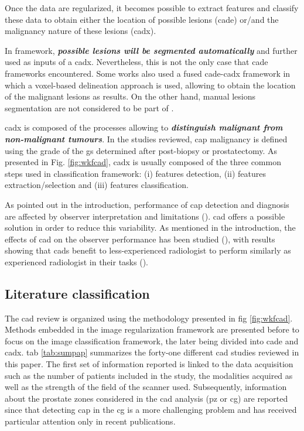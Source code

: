 Once the data are regularized, it becomes possible to extract features and classify these data to obtain either the location of possible lesions (\ac{cade}) or/and the malignancy nature of these lesions (\ac{cadx}).

In  framework, \textbf{\textit{possible lesions will be segmented automatically}} and further used as inputs of a \ac{cadx}. Nevertheless, this is not the only case that \ac{cade} frameworks encountered. Some works also used a fused \ac{cade}-\ac{cadx} framework in which a voxel-based delineation approach is used, allowing to obtain the location of the malignant lesions as results. On the other hand, manual lesions segmentation are not considered to be part of .

\Ac{cadx} is composed of the processes allowing to \textbf{\textit{distinguish malignant from non-malignant tumours}}. In the studies reviewed, \ac{cap} malignancy is defined using the grade of the \ac{gs} determined after post-biopsy or prostatectomy. As presented in Fig. \ref{fig:wkfcad}, \ac{cadx} is usually composed of the three common steps used in classification framework: (i) features detection, (ii) features extraction/selection and (iii) features classification.

As pointed out in the introduction, performance of \ac{cap} detection and diagnosis are affected by observer interpretation and limitations (\cite{Giger2008,Hambrock2013}). \ac{cad} offers a possible solution in order to reduce this variability. As mentioned in the introduction, the effects of \ac{cad} on the observer performance has been studied (\cite{Hambrock2013}), with results showing that \acp{cad} benefit to less-experienced radiologist to perform similarly as experienced radiologist in their tasks (\cite{Hambrock2013}). 

\subsection{Literature classification}

The \ac{cad} review is organized using the methodology presented in \acs{fig} \ref{fig:wkfcad}. Methods embedded in the image regularization framework are presented before to focus on the image classification framework, the later being divided into \ac{cade} and \ac{cadx}. %
\Acl{tab} \ref{tab:sumpap} summarizes the forty-one different \ac{cad} studies reviewed in this paper. The first set of information reported is linked to the data acquisition such as the number of patients included in the study, the modalities acquired as well as the strength of the field of the scanner used. Subsequently, information about the prostate zones considered in the \ac{cad} analysis (\ac{pz} or \ac{cg}) are reported since that detecting \ac{cap} in the \ac{cg} is a more challenging problem and has received particular attention only in recent publications.